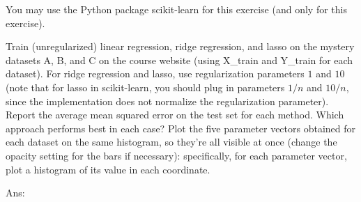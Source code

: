 \documentclass[10pt,letter,notitlepage]{article}
\newcommand{\red}[1]{{\color{red}#1}}
\newcommand{\ans}[1]{{\color{orange}\textsf{Ans}: #1}}
\newcounter{exercise}
\begin{document}
\begin{exercise}

  \red{You may use the Python package scikit-learn for this exercise (and only for this exercise).}

Train (unregularized) linear regression, ridge regression, and lasso on the mystery datasets A, B, and C on the course website (using X\_train and Y\_train for each dataset).
For ridge regression and lasso, use regularization parameters $1$ and $10$ (note that for lasso in scikit-learn, you should plug in parameters $1/n$ and $10/n$, since the implementation does not normalize the regularization parameter).
Report the average mean squared error on the test set for each method.
Which approach performs best in each case?
Plot the five parameter vectors obtained for each dataset on the same histogram, so they're all visible at once (change the opacity setting for the bars if necessary): specifically, for each parameter vector, plot a histogram of its value in each coordinate.

  \ans{}
\end{exercise}
\end{document}
